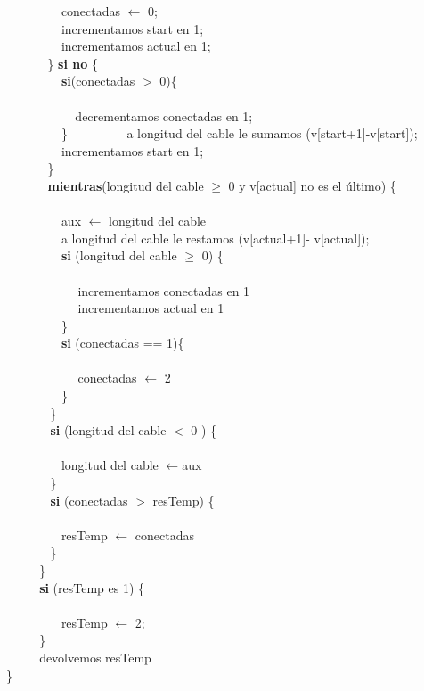 $~~~~~~~~~~~~~~~~~~~~$conectadas  $\leftarrow$ 0; \\
$~~~~~~~~~~~~~~~~~~~~$incrementamos start en 1;  \\
$~~~~~~~~~~~~~~~~~~~~$incrementamos actual en 1;  \\
$~~~~~~~~~~~~~~~$\} \textbf{si no} \{ \\
$~~~~~~~~~~~~~~~~~~~~$\textbf{si}(conectadas $>$ 0)\{ \\ \\
$~~~~~~~~~~~~~~~~~~~~~~~~~$decrementamos conectadas en 1;\\ 
$~~~~~~~~~~~~~~~~~~~~$\}
$~~~~~~~~~~~~~~~~~~~~$a longitud del cable le sumamos (v[start+1]-v[start]);\\
$~~~~~~~~~~~~~~~~~~~~$incrementamos start en 1;  \\
$~~~~~~~~~~~~~~~$\} \\
$~~~~~~~~~~~~~~~$\textbf{mientras}(longitud del cable $\geq$ 0 y v[actual] no es el último) \{ \\  \\
$~~~~~~~~~~~~~~~~~~~~$aux $\leftarrow$ longitud del cable \\
$~~~~~~~~~~~~~~~~~~~~$a longitud del cable  le restamos (v[actual+1]- v[actual]); \\
$~~~~~~~~~~~~~~~~~~~~$\textbf{si} (longitud del cable $\geq$ 0) \{ \\ \\
$~~~~~~~~~~~~~~~~~~~~~~~~~~$incrementamos conectadas en 1  \\
$~~~~~~~~~~~~~~~~~~~~~~~~~~$incrementamos actual en 1  \\
$~~~~~~~~~~~~~~~~~~~~$\} \\
$~~~~~~~~~~~~~~~~~~~~$\textbf{si} (conectadas == 1)\{ \\  \\
$~~~~~~~~~~~~~~~~~~~~~~~~~~$conectadas $\leftarrow$ 2 \\
$~~~~~~~~~~~~~~~~~~~~$\} \\
$~~~~~~~~~~~~~~~~$\} \\
$~~~~~~~~~~~~~~~~$\textbf{si} (longitud del cable $<$ 0 ) \{ \\ \\
$~~~~~~~~~~~~~~~~~~~~$longitud del cable $\leftarrow$aux\\
$~~~~~~~~~~~~~~~~$\} \\
$~~~~~~~~~~~~~~~~$\textbf{si} (conectadas $>$ resTemp) \{ \\ \\
$~~~~~~~~~~~~~~~~~~~~$resTemp $\leftarrow$ conectadas\\
$~~~~~~~~~~~~~~~~$\} \\
$~~~~~~~~~~~~$\} \\
$~~~~~~~~~~~~$\textbf{si} (resTemp es 1) \{ \\ \\
$~~~~~~~~~~~~~~~~~~~~$resTemp $\leftarrow$ 2;\\
$~~~~~~~~~~~~$\} \\
$~~~~~~~~~~~~$devolvemos resTemp  \\
\}\\

